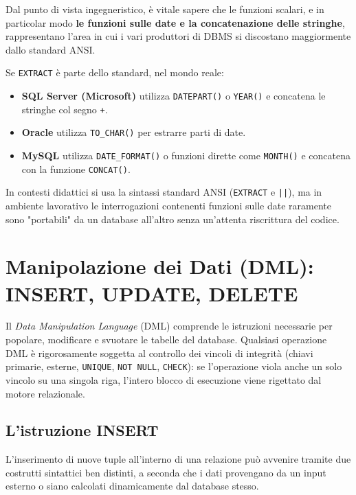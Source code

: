 \begin{warningbox}
Dal punto di vista ingegneristico, è vitale sapere che le funzioni scalari, e in particolar modo \textbf{le funzioni sulle date e la concatenazione delle stringhe}, rappresentano l'area in cui i vari produttori di DBMS si discostano maggiormente dallo standard ANSI. 

Se \texttt{EXTRACT} è parte dello standard, nel mondo reale:
\begin{itemize}
    \item \textbf{SQL Server (Microsoft)} utilizza \texttt{DATEPART()} o \texttt{YEAR()} e concatena le stringhe col segno \texttt{+}.
    \item \textbf{Oracle} utilizza \texttt{TO\_CHAR()} per estrarre parti di date.
    \item \textbf{MySQL} utilizza \texttt{DATE\_FORMAT()} o funzioni dirette come \texttt{MONTH()} e concatena con la funzione \texttt{CONCAT()}.
\end{itemize}
In contesti didattici si usa la sintassi standard ANSI (\texttt{EXTRACT} e \texttt{||}), ma in ambiente lavorativo le interrogazioni contenenti funzioni sulle date raramente sono "portabili" da un database all'altro senza un'attenta riscrittura del codice.
\end{warningbox}

\section{Manipolazione dei Dati (DML): INSERT, UPDATE, DELETE}

Il \textit{Data Manipulation Language} (DML) comprende le istruzioni necessarie per popolare, modificare e svuotare le tabelle del database. Qualsiasi operazione DML è rigorosamente soggetta al controllo dei vincoli di integrità (chiavi primarie, esterne, \texttt{UNIQUE}, \texttt{NOT NULL}, \texttt{CHECK}): se l'operazione viola anche un solo vincolo su una singola riga, l'intero blocco di esecuzione viene rigettato dal motore relazionale.

\subsection{L'istruzione INSERT}

L'inserimento di nuove tuple all'interno di una relazione può avvenire tramite due costrutti sintattici ben distinti, a seconda che i dati provengano da un input esterno o siano calcolati dinamicamente dal database stesso.

